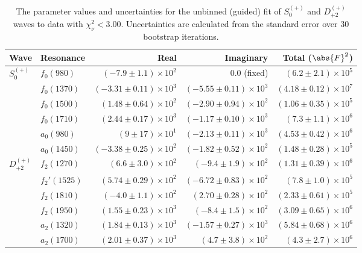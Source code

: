 \begin{table}[ht]
    \begin{center}
        \begin{tabular}{llrrr}\toprule
        Wave & Resonance & Real & Imaginary & Total ($\abs{F}^2$) \\\midrule
$S_{0}^{(+)}$ & $f_{0}(980)$ & $(-7.9 \pm 1.1) \times 10^{2}$ & $0.0$ (fixed) & $(6.2 \pm 2.1) \times 10^{5}$ \\
 & $f_{0}(1370)$ & $(-3.31 \pm 0.11) \times 10^{3}$ & $(-5.55 \pm 0.11) \times 10^{3}$ & $(4.18 \pm 0.12) \times 10^{7}$ \\
 & $f_{0}(1500)$ & $(1.48 \pm 0.64) \times 10^{2}$ & $(-2.90 \pm 0.94) \times 10^{2}$ & $(1.06 \pm 0.35) \times 10^{5}$ \\
 & $f_{0}(1710)$ & $(2.44 \pm 0.17) \times 10^{3}$ & $(-1.17 \pm 0.10) \times 10^{3}$ & $(7.3 \pm 1.1) \times 10^{6}$ \\
 & $a_{0}(980)$ & $(9 \pm 17) \times 10^{1}$ & $(-2.13 \pm 0.11) \times 10^{3}$ & $(4.53 \pm 0.42) \times 10^{6}$ \\
 & $a_{0}(1450)$ & $(-3.38 \pm 0.25) \times 10^{2}$ & $(-1.82 \pm 0.52) \times 10^{2}$ & $(1.48 \pm 0.28) \times 10^{5}$ \\
$D_{+2}^{(+)}$ & $f_{2}(1270)$ & $(6.6 \pm 3.0) \times 10^{2}$ & $(-9.4 \pm 1.9) \times 10^{2}$ & $(1.31 \pm 0.39) \times 10^{6}$ \\
 & $f_{2}'(1525)$ & $(5.74 \pm 0.29) \times 10^{2}$ & $(-6.72 \pm 0.83) \times 10^{2}$ & $(7.8 \pm 1.0) \times 10^{5}$ \\
 & $f_{2}(1810)$ & $(-4.0 \pm 1.1) \times 10^{2}$ & $(2.70 \pm 0.28) \times 10^{2}$ & $(2.33 \pm 0.61) \times 10^{5}$ \\
 & $f_{2}(1950)$ & $(1.55 \pm 0.23) \times 10^{3}$ & $(-8.4 \pm 1.5) \times 10^{2}$ & $(3.09 \pm 0.65) \times 10^{6}$ \\
 & $a_{2}(1320)$ & $(1.84 \pm 0.13) \times 10^{3}$ & $(-1.57 \pm 0.27) \times 10^{3}$ & $(5.84 \pm 0.68) \times 10^{6}$ \\
 & $a_{2}(1700)$ & $(2.01 \pm 0.37) \times 10^{3}$ & $(4.7 \pm 3.8) \times 10^{2}$ & $(4.3 \pm 2.7) \times 10^{6}$ \\\bottomrule
        \end{tabular}
    \caption{The parameter values and uncertainties for the unbinned (guided) fit of $S_{0}^{(+)}$ and $D_{+2}^{(+)}$ waves to data with $\chi^2_\nu < 3.00$. Uncertainties are calculated from the standard error over $30$ bootstrap iterations.}\label{tab:unbinned-fit-chisqdof-3.0-guided-Sp0p-Dp2p}
    \end{center}
\end{table}

